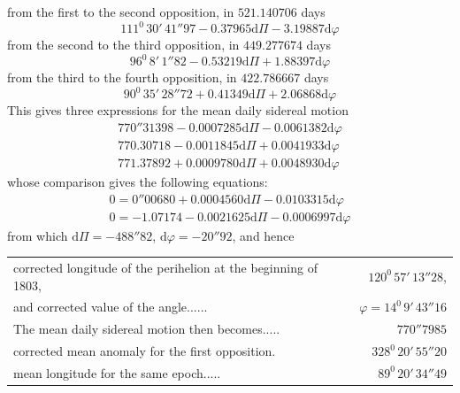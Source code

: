 from the first to the second opposition, in $521.140706$ days
\[
111^0\,30'\,41''97-0.37965\mathrm d\Pi-3.19887\mathrm d\varphi
\]
from the second to the third opposition, in $449.277674$ days
\[
96^0\,8'\,1''82-0.53219\mathrm d\Pi+1.88397\mathrm d\varphi
\]
from the third to the fourth opposition, in $422.786667$ days
\[
90^0\,35'\,28''72+0.41349\mathrm d\Pi+2.06868\mathrm d\varphi
\]
This gives three expressions for the mean daily sidereal motion
\[
\begin{gathered}
770''31398-0.0007285\mathrm d\Pi-0.0061382\mathrm d\varphi\\
770.30718-0.0011845\mathrm d\Pi+0.0041933\mathrm d\varphi\\
771.37892+0.0009780\mathrm d\Pi+0.0048930\mathrm d\varphi
\end{gathered}
\]
whose comparison gives the following equations:
\[
\begin{gathered}
0=0''00680+0.0004560\mathrm d\Pi-0.0103315\mathrm d\varphi\\
0=-1.07174-0.0021625\mathrm d\Pi-0.0006997\mathrm d\varphi
\end{gathered}
\]
from which $\mathrm d\Pi=-488''82$, $\mathrm d\varphi=-20''92$, and hence
\par\nobreak\smallskip
\noindent\hspace*{.06\linewidth}%
{\fontsize{9}{11}\selectfont\begin{tabular}[t]{@{}p{.69\linewidth}@{\enspace}r@{}}
corrected longitude of the perihelion at the beginning of 1803,&$120^0\,57'\,13''28$,\\
and corrected value of the angle\hfill\mbox{.\hspace{.76em}.\hspace{.76em}.\hspace{.76em}.\hspace{.76em}.\hspace{.76em}.}&$\varphi=14^0\,9'\,43''16$\\
The mean daily sidereal motion then becomes\hfill\mbox{.\hspace{.76em}.\hspace{.76em}.\hspace{.76em}.\hspace{.76em}.}&$770''7985$\\
corrected mean anomaly for the first opposition\hfill\mbox{.}&$328^0\,20'\,55''20$\\
mean longitude for the same epoch\hfill\mbox{.\hspace{.76em}.\hspace{.76em}.\hspace{.76em}.\hspace{.76em}.}&$89^0\,20'\,34''49$
\end{tabular}}\par\nobreak\smallskip
